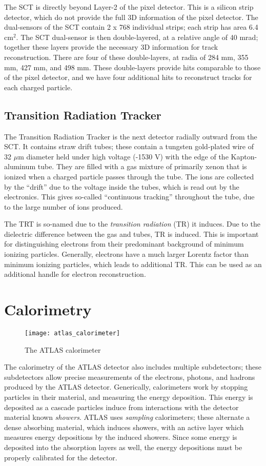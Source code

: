 The SCT is directly beyond Layer-2 of the pixel detector.
This is a silicon strip detector, which do not provide the full 3D information of the pixel detector.
The dual-sensors of the SCT contain 2 x 768 individual strips; each strip has area 6.4 cm$^2$.
The SCT dual-sensor is then double-layered, at a relative angle of 40 mrad; together these layers provide the necessary 3D information for track reconstruction.
There are four of these double-layers, at radia of 284 mm, 355 mm, 427 mm, and 498 mm.
These double-layers provide hits comparable to those of the pixel detector, and we have four additional hits to reconstruct tracks for each charged particle.

\subsection{Transition Radiation Tracker}

The Transition Radiation Tracker is the next detector radially outward from the SCT.
It contains straw drift tubes; these contain a tungsten gold-plated wire of 32 $\mu$m diameter held under high voltage (-1530 V) with the edge of the Kapton-aluminum tube.
They are filled with a gas mixture of primarily xenon that is ionized when a charged particle passes through the tube.
The ions are collected by the ``drift'' due to the voltage inside the tubes, which is read out by the electronics.
This gives so-called ``continuous tracking'' throughout the tube, due to the large number of ions produced.

The TRT is so-named due to the \textit{transition radiation} (TR) it induces.
Due to the dielectric difference between the gas and tubes, TR is induced.
This is important for distinguishing electrons from their predominant background of minimum ionizing particles.
Generally, electrons have a much larger Lorentz factor than minimum ionizing particles, which leads to additional TR.
This can be used as an additional handle for electron reconstruction.

\section{Calorimetry}
\begin{figure}
\caption{The ATLAS calorimeter} \label{fig:atlas_calorimeter}
\texttt{[image: atlas\_calorimeter]}
\end{figure}

The calorimetry of the ATLAS detector also includes multiple subdetectors; these subdetectors allow precise measurements of the electrons, photons, and hadrons produced by the ATLAS detector.
Generically, calorimeters work by stopping particles in their material, and measuring the energy deposition.
This energy is deposited as a cascade particles induce from interactions with the detector material known \textit{showers}.
ATLAS uses \textit{sampling} calorimeters; these alternate a dense absorbing material, which induces showers, with an active layer which measures energy depositions by the induced showers.
Since some energy is deposited into the absorption layers as well, the energy depositions must be properly calibrated for the detector.


